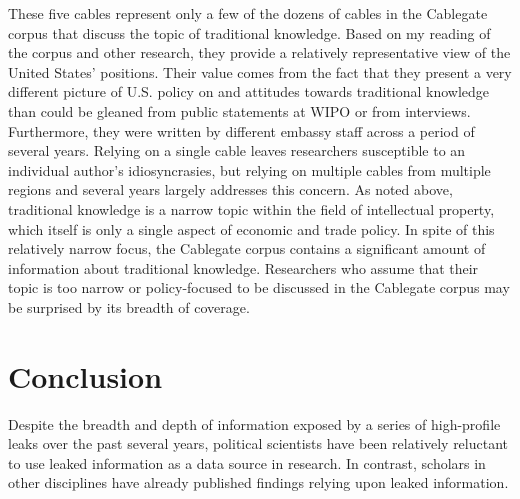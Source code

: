 \documentclass[12pt]{article}
\begin{document}
These five cables represent only a few of the dozens of cables in the Cablegate corpus that discuss 
the topic of 
traditional knowledge. Based on my reading of the corpus and other research, they 
provide a relatively representative 
view of the United States' positions. Their value comes from the fact that they present a very different 
picture of U.S. policy 
on and attitudes towards traditional knowledge than could be gleaned from public statements at WIPO or 
from interviews. Furthermore, they were written by different embassy staff 
across a period of 
several years. Relying on a single cable leaves researchers susceptible to an 
individual author's idiosyncrasies, but relying on multiple cables from multiple regions and 
several years largely addresses this concern. As noted above, traditional knowledge is a narrow topic 
within the field of intellectual property, which itself is only a single aspect of economic and 
trade policy. In spite of this relatively narrow focus, the Cablegate corpus contains a significant 
amount of information about traditional knowledge. Researchers who assume that their topic is too 
narrow or policy-focused to be discussed in the Cablegate corpus may be surprised by its breadth of coverage.

\section*{Conclusion}

Despite the breadth and depth of information exposed by a series of high-profile leaks over the past several years, 
political scientists have been relatively reluctant to use leaked information as a data source in research. 
In contrast, scholars in other disciplines have already published findings relying upon leaked information. 
\end{document}
